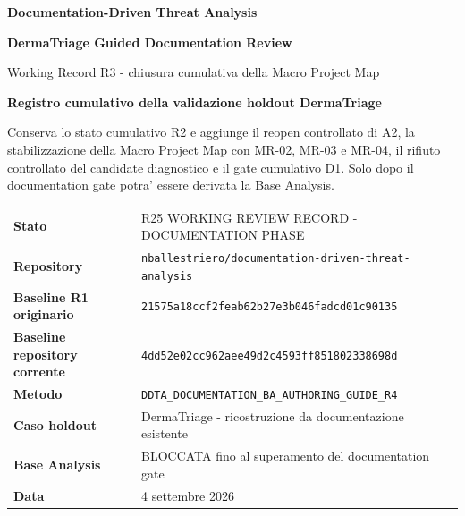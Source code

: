 \documentclass[11pt,a4paper]{article}
\begin{document}

\begin{titlepage}
\thispagestyle{empty}
\vspace*{8mm}

{\sffamily\bfseries\color{DDTANavy}\fontsize{15}{18}\selectfont Documentation-Driven Threat Analysis}\par
\vspace{5mm}
{\sffamily\bfseries\color{DDTANavy}\fontsize{29}{33}\selectfont DermaTriage Guided Documentation Review}\par
\vspace{2mm}
{\sffamily\color{DDTABlue}\fontsize{18}{22}\selectfont Working Record R3 - chiusura cumulativa della Macro Project Map}\par

\vspace{10mm}
\begin{tcolorbox}[enhanced,arc=3pt,boxrule=0pt,colback=DDTANavy,left=12pt,right=12pt,top=11pt,bottom=11pt]
{\color{white}\sffamily\bfseries\large Registro cumulativo della validazione holdout DermaTriage}\par
\vspace{2mm}
{\color{white!88}\small Conserva lo stato cumulativo R2 e aggiunge il reopen controllato di A2, la stabilizzazione della Macro Project Map con MR-02, MR-03 e MR-04, il rifiuto controllato del candidate diagnostico e il gate cumulativo D1. Solo dopo il documentation gate potra' essere derivata la Base Analysis.}
\end{tcolorbox}

\vspace{8mm}
\begin{tabularx}{\textwidth}{L{42mm}Y}
\toprule
\textbf{Stato} & R25 WORKING REVIEW RECORD - DOCUMENTATION PHASE \\
\textbf{Repository} & \texttt{nballestriero/documentation-driven-threat-analysis} \\
\textbf{Baseline R1 originario} & \texttt{21575a18ccf2feab62b27e3b046fadcd01c90135} \\
\textbf{Baseline repository corrente} & \texttt{4dd52e02cc962aee49d2c4593ff851802338698d} \\
\textbf{Metodo} & \texttt{DDTA\_DOCUMENTATION\_BA\_AUTHORING\_GUIDE\_R4} \\
\textbf{Caso holdout} & DermaTriage - ricostruzione da documentazione esistente \\
\textbf{Base Analysis} & BLOCCATA fino al superamento del documentation gate \\
\textbf{Data} & 4 settembre 2026 \\
\bottomrule
\end{tabularx}


\end{titlepage}
\end{document}
